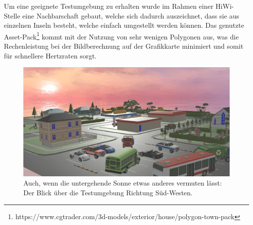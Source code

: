 Um eine geeignete Testumgebung zu erhalten wurde im Rahmen einer HiWi-Stelle eine Nachbarschaft gebaut, welche sich dadurch auszeichnet, dass sie aus einzelnen \glqq Inseln \grqq{} besteht, welche einfach umgestellt werden können. Das genutzte Asset-Pack\footnote{https://www.cgtrader.com/3d-models/exterior/house/polygon-town-pack} kommt mit der Nutzung von sehr wenigen Polygonen aus, was die Rechenleistung bei der Bildberechnung auf der Grafikkarte minimiert und somit für schnellere Hertzraten sorgt.

\begin{figure}[h]
  \centering
  \includegraphics[width=\textwidth]{images/map1.png}
  \caption{Auch, wenn die untergehende Sonne etwas anderes vermuten lässt: Der Blick über die Testumgebung Richtung Süd-Westen.}
  \label{fig:todo}
\end{figure}
